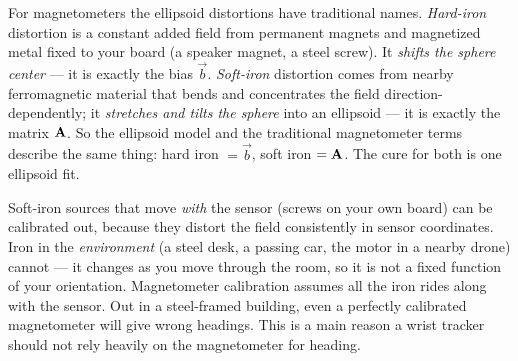 For magnetometers the ellipsoid distortions have traditional names. \emph{Hard-iron}
distortion is a constant added field from permanent magnets and magnetized metal
fixed to your board (a speaker magnet, a steel screw). It \emph{shifts the sphere
center} --- it is exactly the bias $\vec{b}$. \emph{Soft-iron} distortion comes
from nearby ferromagnetic material that bends and concentrates the field
direction-dependently; it \emph{stretches and tilts the sphere} into an ellipsoid
--- it is exactly the matrix $\mathbf{A}$. So the ellipsoid model and the traditional
magnetometer terms describe the same thing: hard iron $=\vec{b}$, soft iron
$=\mathbf{A}$. The cure for both is one ellipsoid fit.

\begin{trapbox}
Soft-iron sources that move \emph{with} the sensor (screws on your own board) can
be calibrated out, because they distort the field consistently in sensor
coordinates. Iron in the \emph{environment} (a steel desk, a passing car, the
motor in a nearby drone) cannot --- it changes as you move through the room, so it
is not a fixed function of your orientation. Magnetometer calibration assumes all
the iron rides along with the sensor. Out in a steel-framed building, even a
perfectly calibrated magnetometer will give wrong headings. This is a main reason a
wrist tracker should not rely heavily on the magnetometer for heading.
\end{trapbox}


